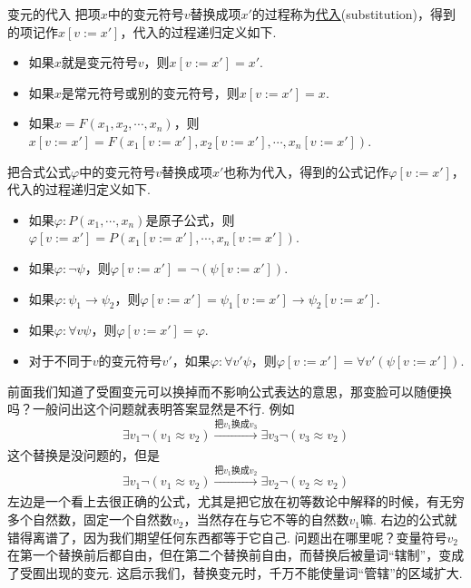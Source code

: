 \begin{definition}{变元的代入}
    把项\(x\)中的变元符号\(v\)替换成项\(x'\)的过程称为\underline{代入}(substitution)，得到的项记作\(x[v:=x']\)，代入的过程递归定义如下.
    \begin{itemize}
        \item 如果\(x\)就是变元符号\(v\)，则\(x[v:=x']=x'\).
        \item 如果\(x\)是常元符号或别的变元符号，则\(x[v:=x']=x\).
        \item 如果\(x=F(x_1,x_2,\cdots,x_n)\)，则\(x[v:=x']=F(x_1[v:=x'],x_2[v:=x'],\cdots,x_n[v:=x'])\).
    \end{itemize}
    把合式公式\(\varphi\)中的变元符号\(v\)替换成项\(x'\)也称为代入，得到的公式记作\(\varphi[v:=x']\)，代入的过程递归定义如下.
    \begin{itemize}
        \item 如果\(\varphi: P(x_1,\cdots,x_n)\)是原子公式，则\(\varphi[v:=x']=P(x_1[v:=x'],\cdots,x_n[v:=x'])\).
        \item 如果\(\varphi: \neg \psi\)，则\(\varphi[v:=x']=\neg(\psi[v:=x'])\).
        \item 如果\(\varphi: \psi_1 \to \psi_2\)，则\(\varphi[v:=x']=\psi_1[v:=x'] \to \psi_2[v:=x']\).
        \item 如果\(\varphi: \forall v \psi\)，则\(\varphi[v:=x']=\varphi\).
        \item 对于不同于\(v\)的变元符号\(v'\)，如果\(\varphi: \forall v' \psi\)，则\(\varphi[v:=x']=\forall v'(\psi[v:=x'])\).
    \end{itemize}
\end{definition}

前面我们知道了受囿变元可以换掉而不影响公式表达的意思，那变脸可以随便换吗？一般问出这个问题就表明答案显然是不行. 例如
\[\exists v_1 \neg(v_1 \approx v_2) \xrightarrow[]{\mbox{把}v_1\mbox{换成}v_3} \exists v_3 \neg (v_3 \approx v_2)\]
这个替换是没问题的，但是
\[\exists v_1 \neg(v_1 \approx v_2) \xrightarrow[]{\mbox{把}v_1\mbox{换成}v_2} \exists v_2 \neg (v_2 \approx v_2)\]
左边是一个看上去很正确的公式，尤其是把它放在初等数论中解释的时候，有无穷多个自然数，固定一个自然数\(v_2\)，当然存在与它不等的自然数\(v_1\)嘛. 右边的公式就错得离谱了，因为我们期望任何东西都等于它自己. 问题出在哪里呢？变量符号\(v_2\)在第一个替换前后都自由，但在第二个替换前自由，而替换后被量词“辖制”，变成了受囿出现的变元. 
这启示我们，替换变元时，千万不能使量词“管辖”的区域扩大.

